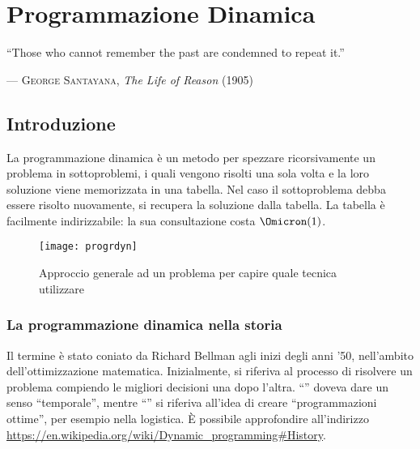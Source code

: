 
\ifsubfile
\usepackage{../settings/subfile}
\setcounter{chapter}{12}

\usepackage[newfloat, cachedir=_minted-cache, outputdir=../build]{minted}
\usepackage{../libraries/set-minted}


\fi
\chapter{Programmazione Dinamica}
\epigraph{\enquote{Those who cannot remember the past are condemned to repeat it.}}%
         {--- \textup{\textsc{George Santayana}, \emph{The Life of Reason} (1905)}}

\section*{Introduzione}

La programmazione dinamica è un metodo per spezzare ricorsivamente un problema in
sottoproblemi, i quali vengono risolti una sola volta e la loro soluzione viene memorizzata in una tabella.
Nel caso il sottoproblema debba essere risolto nuovamente, si recupera la soluzione dalla tabella.
La tabella è facilmente indirizzabile: la sua consultazione costa \(\Omicron(1)\).

\begin{figure}[!ht]
    \centering
    \texttt{[image: progrdyn]}
    \caption{Approccio generale ad un problema per capire quale tecnica utilizzare}
\end{figure}
\vspace{-15pt}

\subsection*{La programmazione dinamica nella storia}

Il termine  è stato coniato da Richard Bellman agli inizi degli anni '50, nell'ambito dell'ottimizzazione matematica.
Inizialmente, si riferiva al processo di risolvere un problema compiendo le migliori decisioni una dopo l'altra.
\enquote{} doveva dare un senso \enquote{temporale}, mentre \enquote{} si riferiva all'idea di creare \enquote{programmazioni ottime}, per esempio nella logistica.
\`{E} possibile approfondire all'indirizzo \url{https://en.wikipedia.org/wiki/Dynamic_programming#History}.

